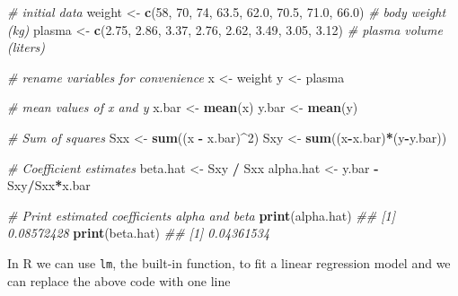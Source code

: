 \documentclass[
]{book}
\newenvironment{Shaded}{\begin{snugshade}}{\end{snugshade}}
\newcommand{\CommentTok}[1]{\textcolor[rgb]{0.56,0.35,0.01}{\textit{#1}}}
\newcommand{\DecValTok}[1]{\textcolor[rgb]{0.00,0.00,0.81}{#1}}
\newcommand{\FloatTok}[1]{\textcolor[rgb]{0.00,0.00,0.81}{#1}}
\newcommand{\KeywordTok}[1]{\textcolor[rgb]{0.13,0.29,0.53}{\textbf{#1}}}
\newcommand{\NormalTok}[1]{#1}
\newcommand{\OperatorTok}[1]{\textcolor[rgb]{0.81,0.36,0.00}{\textbf{#1}}}
\newcommand{\StringTok}[1]{\textcolor[rgb]{0.31,0.60,0.02}{#1}}
\theoremstyle{definition}
\theoremstyle{definition}
\theoremstyle{definition}
\theoremstyle{remark}
\begin{document}
\begin{Shaded}
\begin{Highlighting}[]
\CommentTok{\# initial data}
\NormalTok{weight \textless{}{-}}\StringTok{ }\KeywordTok{c}\NormalTok{(}\DecValTok{58}\NormalTok{, }\DecValTok{70}\NormalTok{, }\DecValTok{74}\NormalTok{, }\FloatTok{63.5}\NormalTok{, }\FloatTok{62.0}\NormalTok{, }\FloatTok{70.5}\NormalTok{, }\FloatTok{71.0}\NormalTok{, }\FloatTok{66.0}\NormalTok{) }\CommentTok{\# body weight (kg)}
\NormalTok{plasma \textless{}{-}}\StringTok{ }\KeywordTok{c}\NormalTok{(}\FloatTok{2.75}\NormalTok{, }\FloatTok{2.86}\NormalTok{, }\FloatTok{3.37}\NormalTok{, }\FloatTok{2.76}\NormalTok{, }\FloatTok{2.62}\NormalTok{, }\FloatTok{3.49}\NormalTok{, }\FloatTok{3.05}\NormalTok{, }\FloatTok{3.12}\NormalTok{) }\CommentTok{\# plasma volume (liters)}

\CommentTok{\# rename variables for convenience}
\NormalTok{x \textless{}{-}}\StringTok{ }\NormalTok{weight}
\NormalTok{y \textless{}{-}}\StringTok{ }\NormalTok{plasma}

\CommentTok{\# mean values of x and y}
\NormalTok{x.bar \textless{}{-}}\StringTok{ }\KeywordTok{mean}\NormalTok{(x)}
\NormalTok{y.bar \textless{}{-}}\StringTok{ }\KeywordTok{mean}\NormalTok{(y)}

\CommentTok{\# Sum of squares}
\NormalTok{Sxx \textless{}{-}}\StringTok{  }\KeywordTok{sum}\NormalTok{((x }\OperatorTok{{-}}\StringTok{ }\NormalTok{x.bar)}\OperatorTok{\^{}}\DecValTok{2}\NormalTok{)}
\NormalTok{Sxy \textless{}{-}}\StringTok{ }\KeywordTok{sum}\NormalTok{((x}\OperatorTok{{-}}\NormalTok{x.bar)}\OperatorTok{*}\NormalTok{(y}\OperatorTok{{-}}\NormalTok{y.bar))}

\CommentTok{\# Coefficient estimates}
\NormalTok{beta.hat \textless{}{-}}\StringTok{ }\NormalTok{Sxy }\OperatorTok{/}\StringTok{ }\NormalTok{Sxx}
\NormalTok{alpha.hat \textless{}{-}}\StringTok{ }\NormalTok{y.bar }\OperatorTok{{-}}\StringTok{ }\NormalTok{Sxy}\OperatorTok{/}\NormalTok{Sxx}\OperatorTok{*}\NormalTok{x.bar}

\CommentTok{\# Print estimated coefficients alpha and beta}
\KeywordTok{print}\NormalTok{(alpha.hat)}
\CommentTok{\#\# [1] 0.08572428}
\KeywordTok{print}\NormalTok{(beta.hat)}
\CommentTok{\#\# [1] 0.04361534}
\end{Highlighting}
\end{Shaded}

In R we can use \texttt{lm}, the built-in function, to fit a linear regression model and we can replace the above code with one line
\end{document}
